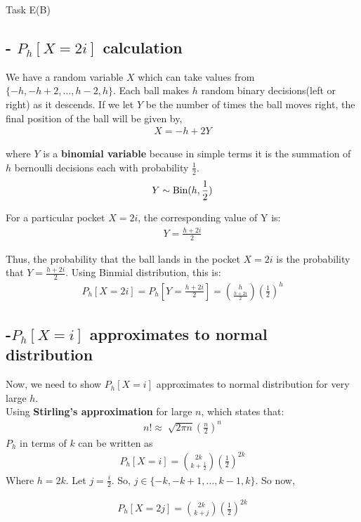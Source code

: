 \begin{task}{Task E(B)}
	\subsection*{- $P_h[X=2i]$ calculation}
	We have a random variable $X$ which can take values from
	$\{-h,-h+2,\ldots,h-2,h\}$. Each ball makes $h$ random binary
	decisions(left or right) as it descends. If we let $Y$ be the number of
	times the ball moves right, the final position of the ball will be
	given by,
	\begin{align}
		X = -h+2Y
	\end{align}

	where $Y$ is a \textbf{binomial variable} because in simple terms it is
	the summation of $h$ bernoulli decisions each with probability
	$\frac{1}{2}$.
	\begin{align}
		Y \sim \text{Bin}(h,\frac{1}{2})
	\end{align}

	For a particular pocket $X = 2i$, the corresponding value of Y is:
	\begin{align}
		Y = \frac{h+2i}{2}
	\end{align}

	Thus, the probability that the ball lands in the pocket $X=2i$ is the
	probability that $Y = \frac{h+2i}{2}$. Using Binmial distribution, this
	is:
	\begin{align}
		P_h[X=2i]=P_h\left[Y=\frac{h+2i}{2}\right]=\binom{h}{\frac{h+2i}{2}}\left(\frac{1}{2}\right)^h
	\end{align}

	\subsection*{-$P_h[X=i]$ approximates to normal distribution }
	Now, we need to show $P_h[X=i]$ approximates to normal distribution for very large $h$.\\
	Using \textbf{Stirling's approximation} for large $n$, which states that:
	\begin{align}
		n!\approx \sqrt[]{2\pi n}\left(\frac{n}{2}\right)^n
	\end{align}
	$P_h$ in terms of $k$ can be written as
	\begin{align}
		P_h[X=i] = \binom{2k}{k+\frac{i}{2}}\left(\frac{1}{2}\right)^{2k}
	\end{align}
	Where $h=2k$. Let $j=\frac{i}{2}$. So, $j\in\{-k,-k+1,\ldots,k-1,k\}$. So now,

	\begin{align}
		P_h[X=2j] =  \binom{2k}{k+j}\left(\frac{1}{2}\right)^{2k}
	\end{align}


\end{task}
